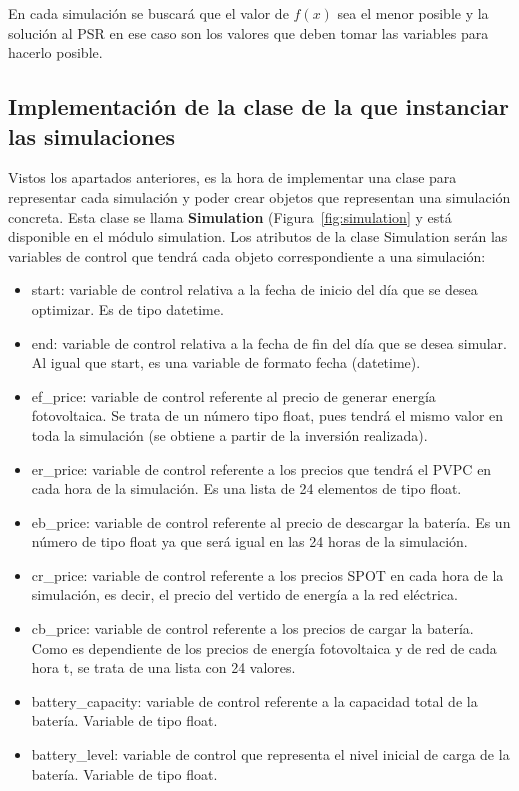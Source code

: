 En cada simulación se buscará que el valor de $ f(x) $ sea el menor posible y la solución al PSR en ese caso son los valores que deben tomar las variables para hacerlo posible.

\subsection{Implementación de la clase de la que instanciar las simulaciones}
Vistos los apartados anteriores, es la hora de implementar una clase para representar cada simulación y poder crear objetos que representan una simulación concreta. Esta clase se llama \textbf{Simulation} (Figura~\ref{fig:simulation} y está disponible en el módulo simulation. Los atributos de la clase Simulation serán las variables de control que tendrá cada objeto correspondiente a una simulación:
\begin{itemize}
        \item start: variable de control relativa a la fecha de inicio del día que se desea optimizar. Es de tipo datetime.
        \item end: variable de control relativa a la fecha de fin del día que se desea simular. Al igual que start, es una variable de formato fecha (datetime).
        \item ef\_price: variable de control referente al precio de generar energía fotovoltaica. Se trata de un número tipo float, pues tendrá el mismo valor en toda la simulación (se obtiene a partir de la inversión realizada).
        \item er\_price: variable de control referente a los precios que tendrá el \gls{PVPC} en cada hora de la simulación. Es una lista de 24 elementos de tipo float.
        \item eb\_price: variable de control referente al precio de descargar la batería. Es un número de tipo float ya que será igual en las 24 horas de la simulación.
        \item cr\_price: variable de control referente a los precios SPOT en cada hora de la simulación, es decir, el precio del vertido de energía a la red eléctrica.
        \item cb\_price: variable de control referente a los precios de cargar la batería. Como es dependiente de los precios de energía fotovoltaica y de red de cada hora t, se trata de una lista con 24 valores.
        \item battery\_capacity: variable de control referente a la capacidad total de la batería. Variable de tipo float.
        \item battery\_level: variable de control que representa el nivel inicial de carga de la batería. Variable de tipo float.

\end{itemize}
